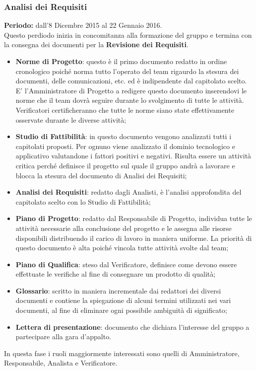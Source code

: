 \subsubsection{Analisi dei Requisiti}
\textbf{Periodo:} dall'8 Dicembre 2015 al 22 Gennaio 2016.\\
Questo perdiodo inizia in concomitanza alla formazione del gruppo e termina con la consegna dei documenti per la \textbf{Revisione dei Requisiti}.
\begin{itemize}
		\item \textbf{Norme di Progetto}: questo è il primo documento redatto in ordine cronologico poiché norma tutto l'operato del team rigaurdo la stesura dei documenti, delle comunicazioni, etc. ed è indipendente dal capitolato scelto. E' l’Amministratore di Progetto a redigere questo documento inserendovi le norme che il team dovrà seguire durante lo svolgimento di tutte le attività. Verificatori certificheranno che tutte le norme siano state effettivamente osservate durante le diverse attività;
		\item \textbf{Studio di Fattibilità}: in questo documento vengono analizzati tutti i capitolati proposti. Per ognuno viene analizzato il dominio tecnologico e applicativo valutandone i fattori positivi e negativi. Risulta essere un attività	critica perché definisce il progetto sul quale il gruppo andrà a lavorare e blocca la stesura del documento di Analisi dei Requisiti;
		\item \textbf{Analisi dei Requisiti}: redatto dagli Analisti, è l'analisi approfondita del capitolato scelto con lo Studio di Fattibilità;
		\item \textbf{Piano di Progetto}: redatto dal Responsabile di Progetto, individua tutte le attività necessarie alla conclusione del progetto e le assegna alle risorse disponibili distribuendo il carico di lavoro in maniera uniforme.
		La priorità di questo documento è alta poiché vincola tutte attività svolte dal team;
		\item \textbf{Piano di Qualifica}: steso dal Verificatore, definisce come devono essere effettuate le verifiche al fine di consegnare un prodotto di qualità;
		\item \textbf{Glossario}: scritto in maniera incrementale dai redattori dei diversi documenti e contiene la spiegazione di alcuni termini utilizzati nei vari documenti, al fine di eliminare ogni possibile ambiguità di significato;
		\item \textbf{Lettera di presentazione}: documento che dichiara l’interesse del gruppo a partecipare alla gara d’appalto.
\end{itemize}
In questa fase i ruoli maggiormente interessati sono quelli di Amministratore, Responsabile, Analista e Verificatore. 

